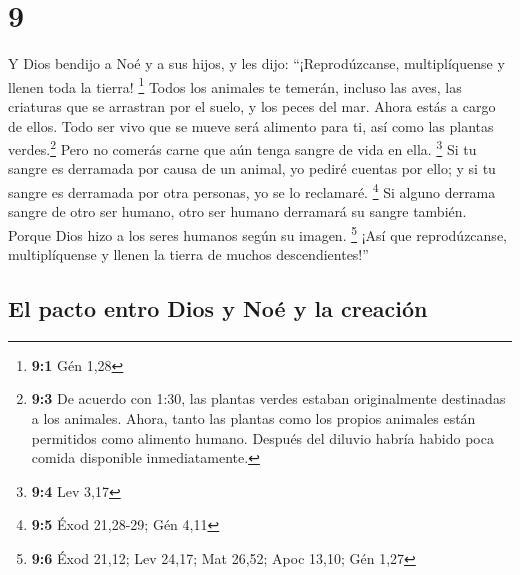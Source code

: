 \hypertarget{section-8}{%
\section{9}\label{section-8}}

 Y Dios bendijo a Noé y a sus hijos, y les dijo:
``¡Reprodúzcanse, multiplíquense y llenen toda la tierra! \footnote{\textbf{9:1}
  Gén 1,28}  Todos los animales te temerán, incluso las
aves, las criaturas que se arrastran por el suelo, y los peces del mar.
Ahora estás a cargo de ellos.  Todo ser vivo que se mueve
será alimento para ti, así como las plantas verdes.\footnote{\textbf{9:3}
  De acuerdo con 1:30, las plantas verdes estaban originalmente
  destinadas a los animales. Ahora, tanto las plantas como los propios
  animales están permitidos como alimento humano. Después del diluvio
  habría habido poca comida disponible inmediatamente.} 
Pero no comerás carne que aún tenga sangre de vida en ella. \footnote{\textbf{9:4}
  Lev 3,17}  Si tu sangre es derramada por causa de un
animal, yo pediré cuentas por ello; y si tu sangre es derramada por otra
personas, yo se lo reclamaré. \footnote{\textbf{9:5} Éxod 21,28-29; Gén
  4,11}  Si alguno derrama sangre de otro ser humano, otro
ser humano derramará su sangre también. Porque Dios hizo a los seres
humanos según su imagen. \footnote{\textbf{9:6} Éxod 21,12; Lev 24,17;
  Mat 26,52; Apoc 13,10; Gén 1,27}  ¡Así que
reprodúzcanse, multiplíquense y llenen la tierra de muchos
descendientes!''

\hypertarget{el-pacto-entro-dios-y-nouxe9-y-la-creaciuxf3n}{%
\subsection{El pacto entro Dios y Noé y la
creación}\label{el-pacto-entro-dios-y-nouxe9-y-la-creaciuxf3n}}

